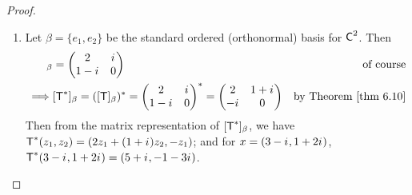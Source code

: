 \begin{proof}
\begin{enumerate}
\item Let \(\beta = \{ e_1, e_2 \}\) be the standard ordered (orthonormal) basis for \(\textsf{C}^2\).
Then
\begin{align*}
    [\T]_{\beta} & = \begin{pmatrix} 2 & \iu \\ 1 - \iu & 0 \end{pmatrix} & \text{of course} \\
    \implies & [\T^*]_{\beta} = ([\T]_{\beta})^* = \begin{pmatrix} 2 & \iu \\ 1 - \iu & 0 \end{pmatrix}^* = \begin{pmatrix} 2 & 1 + \iu \\ -\iu & 0 \end{pmatrix} & \text{by \THM{6.10}}
\end{align*}
Then from the matrix representation of \([\textsf{T}^*]_{\beta}\), we have \(\textsf{T}^*(z_1, z_2) = (2z_1 + (1 + {i\mkern1mu})z_2, -z_1)\); and for \(x = (3 - {i\mkern1mu}, 1 + 2{i\mkern1mu})\), \(\textsf{T}^*(3 - {i\mkern1mu}, 1 + 2{i\mkern1mu}) = (5 + {i\mkern1mu}, -1 - 3{i\mkern1mu})\).


\end{enumerate}
\end{proof}
